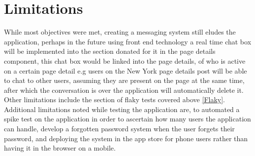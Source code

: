 \section{Limitations}\label{sec:Limit}
While most objectives were met, creating a messaging system still eludes the application, perhaps in the future using front end technology a real time chat box will be implemented into the section donated for it in the page details component, this chat box would be linked into the page details, of who is active on a certain page detail e.g users on the New York page details post will be able to chat to other users, assuming they are present on the page at the same time, after which the conversation is over the application will automatically delete it. Other limitations include the section of flaky tests covered above \ref{Flaky}. Additional limitations noted while testing the application are, to automated a spike test on the application in order to ascertain how many users the application can handle, develop a forgotten password system when the user forgets their password, and deploying the system in the app store for phone users rather than having it in the browser on a mobile.